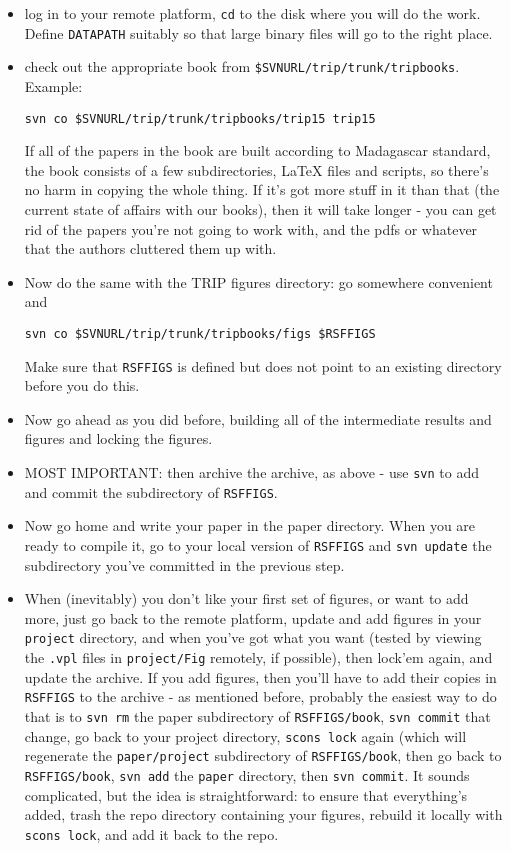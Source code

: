 \begin{itemize}
\item log in to your remote platform, {\tt cd} to the disk where you will do the work. Define {\tt DATAPATH} suitably so that large binary files will go to the right place.
\item check out the appropriate book from {\tt \$SVNURL/trip/trunk/tripbooks}. Example:
\begin{verbatim}
svn co $SVNURL/trip/trunk/tripbooks/trip15 trip15
\end{verbatim}
If all of the papers in the book are built according to Madagascar standard, the book consists of a few subdirectories, LaTeX files and scripts, so there's no harm in copying the whole thing. If it's got more stuff in it than that (the current state of affairs with our books), then it will take longer - you can get rid of the papers you're not going to work with, and the pdfs or whatever that the authors cluttered them up with.
\item Now do the same with the TRIP figures directory: go somewhere convenient and
\begin{verbatim}
svn co $SVNURL/trip/trunk/tripbooks/figs $RSFFIGS
\end{verbatim}
Make sure that {\tt RSFFIGS} is defined but does not point to an existing directory before you do this.
\item Now go ahead as you did before, building all of the intermediate results and figures and locking the figures.
\item MOST IMPORTANT: then archive the archive, as above - use {\tt svn} to add and commit the subdirectory of {\tt RSFFIGS}.
\item Now go home and write your paper in the paper directory. When you are ready to compile it, go to your local version of {\tt RSFFIGS} and {\tt svn update} the subdirectory you've committed in the previous step. 
\item When (inevitably) you don't like your first set of figures, or want to add more, just go back to the remote platform, update and add figures in your {\tt project} directory, and when you've got what you want (tested by viewing the {\tt .vpl} files in {\tt project/Fig} remotely, if possible), then lock'em again, and update the archive. If you add figures, then you'll have to add their copies in {\tt RSFFIGS} to the archive - as mentioned before, probably the easiest way to do that is to {\tt svn rm} the paper subdirectory of {\tt RSFFIGS/book}, {\tt svn commit} that change, go back to your project directory, {\tt scons lock} again (which will regenerate the {\tt paper/project} subdirectory of {\tt RSFFIGS/book}, then go back to {\tt RSFFIGS/book}, {\tt svn add} the {\tt paper} directory, then {\tt svn commit}. It sounds complicated, but the idea is straightforward: to ensure that everything's added, trash the repo directory containing your figures, rebuild it locally with {\tt scons lock}, and add it back to the repo.
\end{itemize}

